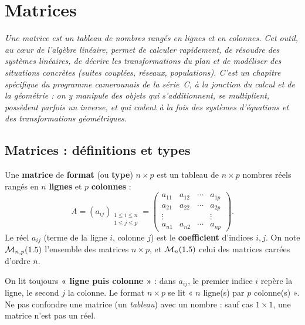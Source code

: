 \chapter{Matrices}

\noindent\textit{Une matrice est un tableau de nombres rangés en lignes et en colonnes.
Cet outil, au cœur de l'algèbre linéaire, permet de calculer rapidement, de résoudre des
systèmes linéaires, de décrire les transformations du plan et de modéliser des situations
concrètes (suites couplées, réseaux, populations). C'est un chapitre spécifique du programme
camerounais de la série~C, à la jonction du calcul et de la géométrie : on y manipule des
\emph{objets} qui s'additionnent, se multiplient, possèdent parfois un \emph{inverse}, et
qui codent à la fois des systèmes d'équations et des transformations géométriques.}
\vspace{8pt}

\section{Matrices : définitions et types}

\begin{definition}[Matrice]
Une \textbf{matrice} de \textbf{format} (ou \textbf{type}) $n\times p$ est un tableau de
$n\times p$ nombres réels rangés en $n$ \textbf{lignes} et $p$ \textbf{colonnes} :
\[
A=(a_{ij})_{\substack{1\le i\le n\\ 1\le j\le p}}=
\begin{pmatrix} a_{11} & a_{12} & \cdots & a_{1p}\\ a_{21} & a_{22} & \cdots & a_{2p}\\
\vdots & & & \vdots\\ a_{n1} & a_{n2} & \cdots & a_{np}\end{pmatrix}.
\]
Le réel $a_{ij}$ (terme de la ligne $i$, colonne $j$) est le \textbf{coefficient} d'indices
$i,j$. On note $\mathcal M_{n,p}(1.5)$ l'ensemble des matrices $n\times p$, et $\mathcal M_n(1.5)$
celui des matrices carrées d'ordre $n$.
\end{definition}

\begin{remarque}
On lit toujours \textbf{« ligne puis colonne »} : dans $a_{ij}$, le premier indice $i$ repère la
ligne, le second $j$ la colonne. Le format $n\times p$ se lit « $n$ ligne(s) par $p$ colonne(s) ».
Ne pas confondre une matrice (un \emph{tableau}) avec un nombre : sauf cas $1\times1$, une
matrice n'est pas un réel.
\end{remarque}

